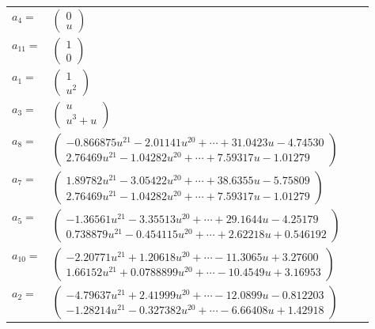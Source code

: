 \documentclass[1p]{elsarticle_modified}
\theoremstyle{definition}
\begin{document}
\begin{tabular}{m{7pt} m{180pt} m{7pt} m{180pt} }
\flushright $a_{4}=$&$\begin{pmatrix}0\\u\end{pmatrix}$ \\
\flushright $a_{11}=$&$\begin{pmatrix}1\\0\end{pmatrix}$ \\
\flushright $a_{1}=$&$\begin{pmatrix}1\\u^2\end{pmatrix}$ \\
\flushright $a_{3}=$&$\begin{pmatrix}u\\u^3+u\end{pmatrix}$ \\
\flushright $a_{8}=$&$\begin{pmatrix}-0.866875 u^{21}-2.01141 u^{20}+\cdots+31.0423 u-4.74530\\2.76469 u^{21}-1.04282 u^{20}+\cdots+7.59317 u-1.01279\end{pmatrix}$ \\
\flushright $a_{7}=$&$\begin{pmatrix}1.89782 u^{21}-3.05422 u^{20}+\cdots+38.6355 u-5.75809\\2.76469 u^{21}-1.04282 u^{20}+\cdots+7.59317 u-1.01279\end{pmatrix}$ \\
\flushright $a_{5}=$&$\begin{pmatrix}-1.36561 u^{21}-3.35513 u^{20}+\cdots+29.1644 u-4.25179\\0.738879 u^{21}-0.454115 u^{20}+\cdots+2.62218 u+0.546192\end{pmatrix}$ \\
\flushright $a_{10}=$&$\begin{pmatrix}-2.20771 u^{21}+1.20618 u^{20}+\cdots-11.3065 u+3.27600\\1.66152 u^{21}+0.0788899 u^{20}+\cdots-10.4549 u+3.16953\end{pmatrix}$ \\
\flushright $a_{2}=$&$\begin{pmatrix}-4.79637 u^{21}+2.41999 u^{20}+\cdots-12.0899 u-0.812203\\-1.28214 u^{21}-0.327382 u^{20}+\cdots-6.66408 u+1.42918\end{pmatrix}$ \\

\end{tabular}
\end{document}
